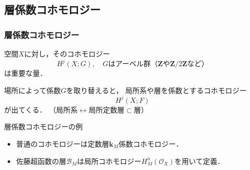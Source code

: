 \documentclass[dvipdfmx,10pt,aspectratio=169,leqno]{beamer}%
\newcommand{\zz}{\mathbf{Z}}
\newcommand{\kk}{\mathbf{k}}
\newcommand{\mcal}{\mathcal}
\numberwithin{equation}{subsection}
\newcommand{\cB}{\mcal{B}}
\newcommand{\cO}{\mcal{O}}
\theoremstyle{mystyle}
\begin{document}
\subsection{層係数コホモロジー}
\begin{frame}
  \frametitle{層係数コホモロジー}
  空間\(X\)に対し，そのコホモロジー
  \[
      H^{j}(X;G),\quad\text{\(G\)はアーベル群（\(\zz\)や\(\zz/2\zz\)など）}
  \]は重要な量．\pause
  
  場所によって係数\(G\)を取り替えると，
  局所系や層を係数とするコホモロジー
  \[
      H^{j}(X;F)
  \]が出てくる．
  （\(
      \text{局所系}
      \leftrightarrow
      \text{局所定数層}
      \subset\text{層}
  \)）\pause
  \begin{exampleblock}{層係数コホモロジーの例}
    \begin{itemize}
      \item 普通のコホモロジーは定数層\(\kk_M\)係数コホモロジー．
      \item 佐藤超函数の層\(\cB_M\)は局所コホモロジー\(H^{n}_{M}(\cO_X)\)を用いて定義．
    \end{itemize}
  \end{exampleblock}
\end{frame}
\end{document}
